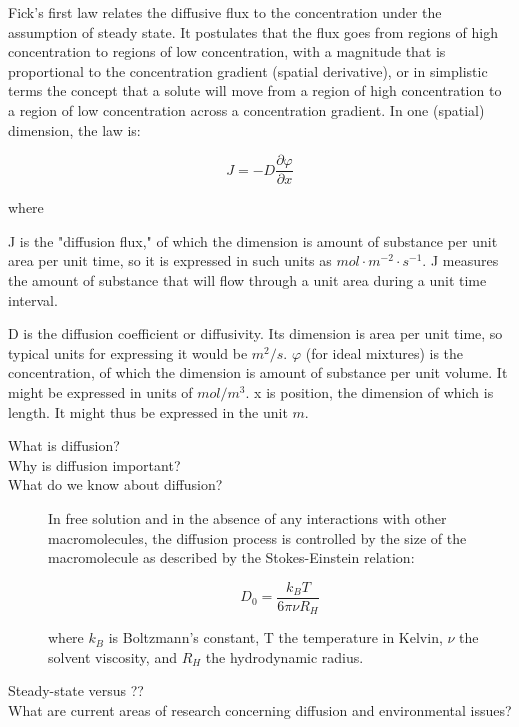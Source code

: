 \documentclass{article}
\begin{document}
Fick's first law relates the diffusive flux to the concentration under the assumption of steady state. It postulates that the flux goes from regions of high concentration to regions of low concentration, with a magnitude that is proportional to the concentration gradient (spatial derivative), or in simplistic terms the concept that a solute will move from a region of high concentration to a region of low concentration across a concentration gradient. In one (spatial) dimension, the law is:

\begin{equation}
J=-D{\frac {\partial \varphi }{\partial x}}
\end{equation}

where

J is the "diffusion flux," of which the dimension is amount of substance per unit area per unit time, so it is expressed in such units as $mol\cdot m^{−2}\cdot s^{−1}$. J measures the amount of substance that will flow through a unit area during a unit time interval.

D is the diffusion coefficient or diffusivity. Its dimension is area per unit time, so typical units for expressing it would be $m^2/s$. $\varphi$ (for ideal mixtures) is the concentration, of which the dimension is amount of substance per unit volume. It might be expressed in units of $mol/m^3$.
x is position, the dimension of which is length. It might thus be expressed in the unit $m$.

\begin{description}
	\item[What is diffusion?]

	\item[Why is diffusion important?]
	
	\item[What do we know about diffusion?]
	
In free solution and in the absence of any interactions with other macromolecules, the diffusion process is controlled by the size of the macromolecule as described by the Stokes-Einstein relation:

\begin{equation}
D_0 =  \frac{k_B T}{6 \pi \nu R_H}
\end{equation}

where $k_B$ is Boltzmann's constant, T the temperature in Kelvin, $\nu$ the solvent viscosity, and $R_H$ the hydrodynamic radius.

  \item[Steady-state versus ??]
	\item[What are current areas of research concerning diffusion and environmental issues?]
\end{description}
\end{document}
